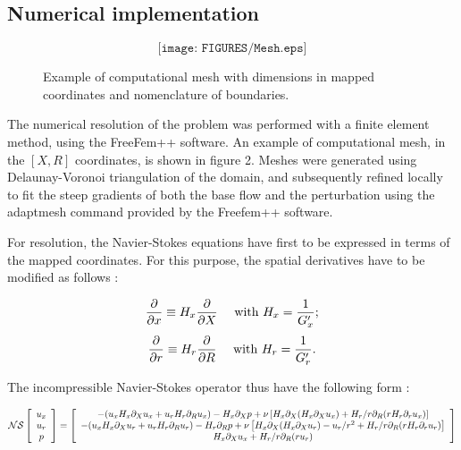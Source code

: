 \documentclass{jfm}
\newcommand\be{\begin{equation}}
\newcommand\ee{\end{equation}}
\newcommand\DP[2]{\frac{\p #1}{\p #2}}
\begin{document}
 


\subsection{Numerical implementation}



\begin{figure}
$$
\texttt{[image: FIGURES/Mesh.eps]}
$$
\caption{Example of computational mesh with dimensions in mapped coordinates and nomenclature of boundaries.} 
\label{fig:Mesh}
\end{figure}




The numerical resolution of the problem was performed with a finite element method,  using the FreeFem++ software. An example of computational mesh, in the $[X,R]$ coordinates, is shown in figure 2. Meshes were generated using Delaunay-Voronoi triangulation of the domain, and subsequently refined locally to fit the steep gradients of both the base flow and the perturbation using the adaptmesh command provided by the Freefem++ software.

For resolution, the Navier-Stokes equations have first to be expressed in terms of the mapped coordinates. For this purpose, the spatial derivatives have to be modified as follows : 

\be
\DP{}{x} \equiv H_x \DP{}{X}  \quad \mbox{ with } H_x =   \frac{1}{G_x'};
\ee
\be
\DP{}{r} \equiv H_r \DP{}{R}  \quad \mbox{ with } H_r =   \frac{1}{G_r'}.
\ee

The incompressible Navier-Stokes operator thus have the following form : 
 
\be
{\cal NS} \left[\begin{array}{c} u_x \\ u_r  \\ p \end{array} \right] =
 \left[\begin{array}{c}
- (u_x  H_x \partial_X u_x + u_r H_r \partial_R u_x) - H_x \partial_X p 
+ \nu \left[ H_x \partial_X ( H_x \partial_X u_x ) + H_r/r\partial_R ( r H_r \partial_r u_x ) \right]
\\
- (u_x  H_x \partial_X u_r + u_r H_r \partial_R u_r) - H_r \partial_R p 
+ \nu \left[ H_x \partial_X ( H_x \partial_X u_r ) - u_r/r^2 + H_r/r\partial_R ( r H_r \partial_r u_r ) \right]
\\
H_x \partial_X u_x + H_r/r \partial_R (r u_r) 
\end{array} \right] 
\label{eq:NS}
\ee
\end{document}
